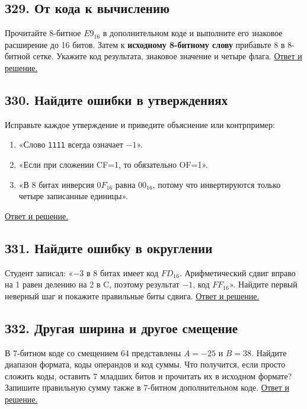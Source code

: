 \subsection*{З29. От кода к вычислению}\label{task:z29}
Прочитайте 8-битное $E9_{16}$ в дополнительном коде и выполните его знаковое расширение до 16 битов. Затем к \textbf{исходному 8-битному слову} прибавьте 8 в 8-битной сетке. Укажите код результата, знаковое значение и четыре флага.
\hyperref[ans:z29]{Ответ и решение.}

\subsection*{З30. Найдите ошибки в утверждениях}\label{task:z30}
Исправьте каждое утверждение и приведите объяснение или контрпример:
\begin{enumerate}
    \item «Слово \texttt{1111} всегда означает $-1$».
    \item «Если при сложении CF=1, то обязательно OF=1».
    \item «В 8 битах инверсия $0F_{16}$ равна $00_{16}$, потому что инвертируются только четыре записанные единицы».
\end{enumerate}
\hyperref[ans:z30]{Ответ и решение.}

\subsection*{З31. Найдите ошибку в округлении}\label{task:z31}
Студент записал: «$-3$ в 8 битах имеет код $FD_{16}$. Арифметический сдвиг вправо на 1 равен делению на 2 в C, поэтому результат $-1$, код $FF_{16}$». Найдите первый неверный шаг и покажите правильные биты сдвига.
\hyperref[ans:z31]{Ответ и решение.}

\subsection*{З32. Другая ширина и другое смещение}\label{task:z32}
В 7-битном коде со смещением 64 представлены $A=-25$ и $B=38$. Найдите диапазон формата, коды операндов и код суммы. Что получится, если просто сложить коды, оставить 7 младших битов и прочитать их в исходном формате? Запишите правильную сумму также в 7-битном дополнительном коде.
\hyperref[ans:z32]{Ответ и решение.}
